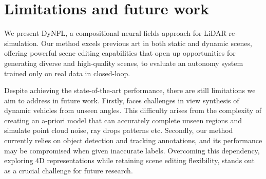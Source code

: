 \section{Limitations and future work}
We present DyNFL, a compositional neural fields approach for LiDAR re-simulation. Our method excels previous art in both static and dynamic scenes, offering powerful scene editing capabilities that open up opportunities for generating diverse and high-quality scenes, to evaluate an autonomy system trained only on real data in closed-loop.

Despite achieving the state-of-the-art performance, there are still limitations we aim to address in future work. Firstly, \dynfl faces challenges in view synthesis of dynamic vehicles from unseen angles. This difficulty arises from the complexity of creating an a-priori model that can accurately complete unseen regions and simulate point cloud noise, ray drops patterns etc. Secondly, our method currently relies on object detection and tracking annotations, and its performance may be compromised when given inaccurate labels. Overcoming this dependency, exploring 4D representations while retaining scene editing flexibility, stands out as a crucial challenge for future research.